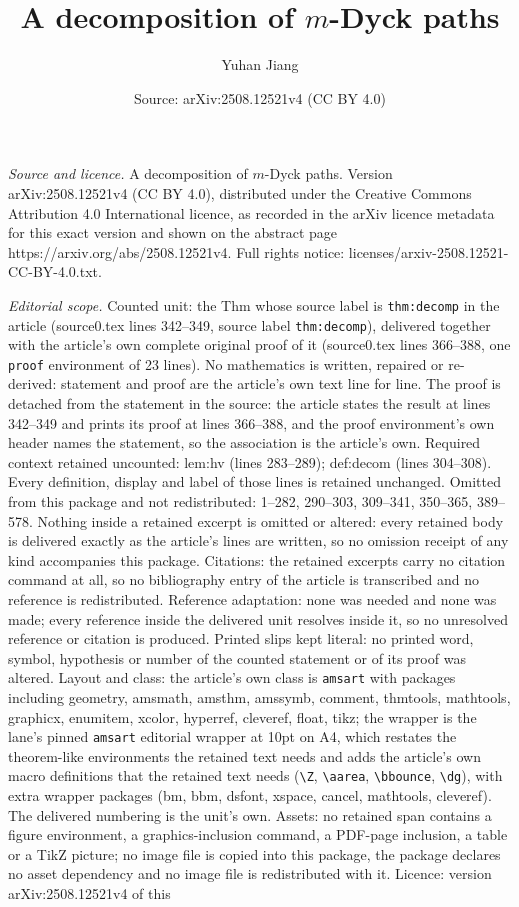 \documentclass[10pt,a4paper]{amsart}
\title[A decomposition of $m$-Dyck paths]{A decomposition of $m$-Dyck paths}
\author{Yuhan Jiang}
\date{Source: arXiv:2508.12521v4 (CC BY 4.0)}
\begin{document}
\maketitle

\noindent\emph{Source and licence.} A decomposition of $m$-Dyck paths. Version arXiv:2508.12521v4 (CC BY 4.0), distributed under the Creative Commons Attribution 4.0 International licence, as recorded in the arXiv licence metadata for this exact version and shown on the abstract page https://arxiv.org/abs/2508.12521v4. Full rights notice: licenses/arxiv-2508.12521-CC-BY-4.0.txt.\par\smallskip

\noindent\textit{Editorial scope.} Counted unit: the Thm whose source label is \texttt{thm:decomp} in the article (source0.tex lines 342--349, source label \texttt{thm:decomp}), delivered together with the article's own complete original proof of it (source0.tex lines 366--388, one \texttt{proof} environment of 23 lines). No mathematics is written, repaired or re-derived: statement and proof are the article's own text line for line. The proof is detached from the statement in the source: the article states the result at lines 342--349 and prints its proof at lines 366--388, and the proof environment's own header names the statement, so the association is the article's own. Required context retained uncounted: lem:hv (lines 283--289); def:decom (lines 304--308). Every definition, display and label of those lines is retained unchanged. Omitted from this package and not redistributed: 1--282, 290--303, 309--341, 350--365, 389--578. Nothing inside a retained excerpt is omitted or altered: every retained body is delivered exactly as the article's lines are written, so no omission receipt of any kind accompanies this package. Citations: the retained excerpts carry no citation command at all, so no bibliography entry of the article is transcribed and no reference is redistributed. Reference adaptation: none was needed and none was made; every reference inside the delivered unit resolves inside it, so no unresolved reference or citation is produced. Printed slips kept literal: no printed word, symbol, hypothesis or number of the counted statement or of its proof was altered. Layout and class: the article's own class is \texttt{amsart} with packages including geometry, amsmath, amsthm, amssymb, comment, thmtools, mathtools, graphicx, enumitem, xcolor, hyperref, cleveref, float, tikz; the wrapper is the lane's pinned \texttt{amsart} editorial wrapper at 10pt on A4, which restates the theorem-like environments the retained text needs and adds the article's own macro definitions that the retained text needs (\texttt{\textbackslash Z}, \texttt{\textbackslash aarea}, \texttt{\textbackslash bbounce}, \texttt{\textbackslash dg}), with extra wrapper packages (bm, bbm, dsfont, xspace, cancel, mathtools, cleveref). The delivered numbering is the unit's own. Assets: no retained span contains a figure environment, a graphics-inclusion command, a PDF-page inclusion, a table or a TikZ picture; no image file is copied into this package, the package declares no asset dependency and no image file is redistributed with it. Licence: version arXiv:2508.12521v4 of this 
\end{document}
